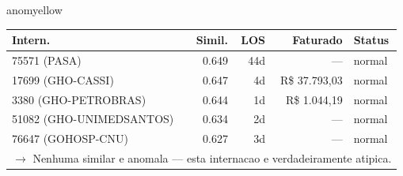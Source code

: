 \documentclass[a4paper,10pt]{article}
\begin{document}
\begin{anomalycard}[Internacao 609 | GHO-PETROBRAS | MODERADO (z=2.08)]{anomyellow}
\begin{tabular}{l r r r l}\toprule\textbf{Intern.} & \textbf{Simil.} & \textbf{LOS} & \textbf{Faturado} & \textbf{Status} \\\midrule
75571 (PASA) & 0.649 & 44d & --- & \textcolor{jcubeblue}{normal} \\
17699 (GHO-CASSI) & 0.647 & 4d & R\$ 37.793,03 & \textcolor{jcubeblue}{normal} \\
3380 (GHO-PETROBRAS) & 0.644 & 1d & R\$ 1.044,19 & \textcolor{jcubeblue}{normal} \\
51082 (GHO-UNIMEDSANTOS) & 0.634 & 2d & --- & \textcolor{jcubeblue}{normal} \\
76647 (GOHOSP-CNU) & 0.627 & 3d & --- & \textcolor{jcubeblue}{normal} \\
\multicolumn{5}{l}{\textcolor{jcubeblue}{\small $\rightarrow$ Nenhuma similar e anomala --- esta internacao e verdadeiramente atipica.}} \\
\bottomrule\end{tabular}


\end{anomalycard}

\newpage
\end{document}
